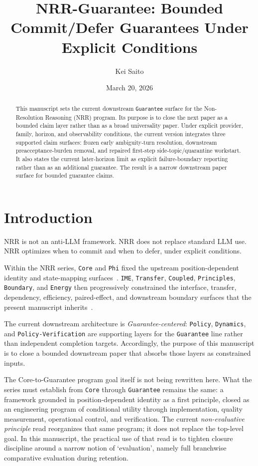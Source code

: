 \documentclass[11pt]{article}
\title{NRR-Guarantee: Bounded Commit/Defer Guarantees Under Explicit Conditions}
\author{Kei Saito}
\date{March 20, 2026}
\begin{document}
\maketitle

\begin{abstract}
This manuscript sets the current downstream \texttt{Guarantee} surface for the
Non-Resolution Reasoning (NRR) program. Its purpose is to close the next paper
as a bounded claim layer rather than as a broad universality paper. Under
explicit provider, family, horizon, and observability conditions, the current
version integrates three supported claim surfaces: frozen early ambiguity-turn
resolution, downstream preacceptance-burden removal, and repaired first-step
side-topic/quarantine workstart. It also states the current later-horizon limit
as explicit failure-boundary reporting rather than as an additional guarantee.
The result is a narrow downstream paper surface for bounded guarantee claims.
\end{abstract}

\section{Introduction}

NRR is not an anti-LLM framework. NRR does not replace standard LLM use. NRR
optimizes when to commit and when to defer, under explicit conditions.

Within the NRR series, \texttt{Core} and \texttt{Phi} fixed the upstream
position-dependent identity and state-mapping surfaces~\cite{saito2025nrr,saito2026phi}.
\texttt{IME}, \texttt{Transfer}, \texttt{Coupled}, \texttt{Principles},
\texttt{Boundary}, and \texttt{Energy} then progressively constrained the
interface, transfer, dependency, efficiency, paired-effect, and downstream
boundary surfaces that the present manuscript inherits~\cite{saito2026ime,saito2026transfer,saito2026coupled,saito2026principles,saito2026boundary,saito2026energy}.

The current downstream architecture is \textit{Guarantee-centered}: \texttt{Policy},
\texttt{Dynamics}, and \texttt{Policy-Verification} are supporting layers for the
\texttt{Guarantee} line rather than independent completion targets. Accordingly, the
purpose of this manuscript is to close a bounded downstream paper that absorbs those
layers as constrained inputs.

The Core-to-Guarantee program goal itself is not being rewritten here. What the
series must establish from \texttt{Core} through \texttt{Guarantee} remains the
same: a framework grounded in position-dependent identity as a first principle,
closed as an engineering program of conditional utility through
implementation, quality measurement, operational control, and verification. The
current \textit{non-evaluative principle} read reorganizes that same program; it
does not replace the top-level goal. In this manuscript, the practical use of
that read is to tighten closure discipline around a narrow notion of
`evaluation', namely full branchwise comparative evaluation during retention.
\end{document}
